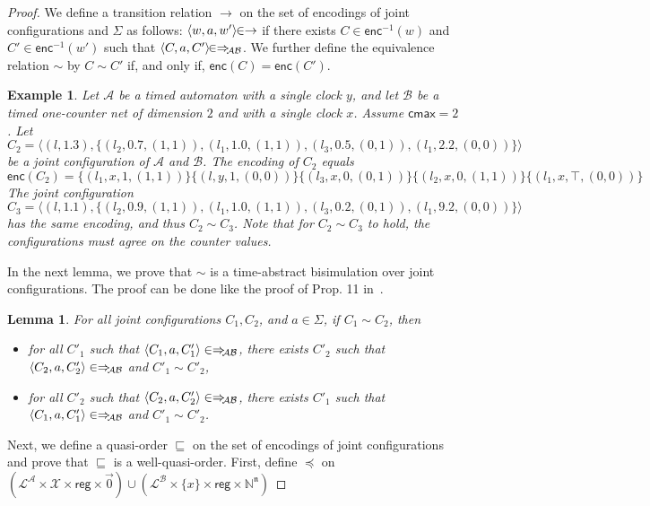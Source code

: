 \documentclass{CSML}
\theoremstyle{plain}\newtheorem{theorem}[thm]{Theorem}
\theoremstyle{plain}\newtheorem{corollary}[thm]{Corollary}
\theoremstyle{plain}\newtheorem{example}[thm]{Example}
\theoremstyle{plain}\newtheorem{lemma}[thm]{Lemma}
\theoremstyle{plain}\newtheorem{remark}[thm]{Remark}
\newcommand{\N}{\mathbb{N}}
\newcommand{\B}{\mathcal{B}}
\newcommand{\reg}{\mathsf{reg}}
\newcommand{\locs}{\mathcal{L}}
\newcommand{\clocks}{\mathcal{X}}
\newcommand{\loc}{\mathit{l}}
\newcommand{\cmax}{\mathsf{cmax}}
\newcommand{\enc}{\mathsf{enc}}
\newcommand{\A}{\mathcal{A}}
\newcommand{\transAB}{\Rightarrow_{\hspace{-.8mm}\A\B}}
\begin{document}
\begin{proof}
		
		We define a transition relation $\to$ on the set of encodings of joint configurations and $\Sigma$ as follows: $\langle w, a, w'\rangle\hspace{-1.2mm}\in\to$ if there exists $C\in \enc^{-1}(w)$ and $C'\in \enc^{-1}(w')$ such that $\langle C,a, C'\rangle\hspace{-1.4mm}\in\transAB$. 
		We further define the equivalence relation $\sim$ by $C\sim C'$ if, and only if, $\enc(C)=\enc(C')$.
		\begin{example}
			Let $\A$ be a timed automaton with a single clock $y$, and let $\B$ be a timed one-counter net of dimension $2$ and with a single clock $x$. Assume $\cmax=2$. 
			Let $$C_2=\langle (\loc,1.3),\{(\loc_2,0.7,(1,1)),(\loc_1,1.0,(1,1)),(\loc_3,0.5,(0,1)),(\loc_1,2.2,(0,0))\}\rangle$$ be a joint configuration of $\A$ and $\B$. 
			The encoding of $C_2$ equals 
			$$\enc(C_2)=
			\{(\loc_1,x,1,(1,1))\}\{(\loc,y,1,(0,0))\}\{(\loc_3,x,0,(0,1))\}\{(\loc_2,x,0,(1,1))\}\{(\loc_1,x,\top,(0,0))\}$$
			The joint configuration 
			$$C_3=\langle(\loc,1.1),\{(\loc_2,0.9,(1,1)),(\loc_1,1.0,(1,1)),(\loc_3,0.2,(0,1)),(\loc_1,9.2,(0,0))\}\rangle$$
			has the same encoding, and thus $C_2\sim C_3$. Note that for $C_2\sim C_3$ to hold, the configurations must agree on the counter values. 
		\end{example}
		In the next lemma, we prove that $\sim$ is a time-abstract bisimulation over joint configurations. 
		The proof can be done like the proof of Prop. 11 in~\cite{DBLP:conf/lics/OuaknineW04}. 
		\begin{lemma}
			\label{lemma_bisim}
			For all joint configurations $C_1, C_2$, and $a\in\Sigma$, if $C_1\sim C_2$, then
			\begin{itemize}
			\item for all $C'_1$ such that $\langle C_1, a, C'_1\rangle\in\transAB$, there exists $C'_2$ such that $\langle C_2,a,C'_2\rangle\in\transAB$ and $C'_1\sim C'_2$,
			\item for all $C'_2$ such that $\langle C_2, a, C'_2\rangle\in\transAB$, there exists $C'_1$ such that $\langle C_1,a,C'_1\rangle\in\transAB$ and $C'_1\sim C'_2$.
			\end{itemize}
		\end{lemma}
\noindent Next, we define a quasi-order $\sqsubseteq$ on the set of encodings of joint configurations and prove that $\sqsubseteq$ is a well-quasi-order. 
		First, define $\preceq$ on 
		$(\locs^\A \times \clocks\times \reg\times\vec{0}) \cup (\locs^\B \times \{x\}\times \reg \times \N^{\mathfrak{n}})$ 

\end{proof}
\end{document}
